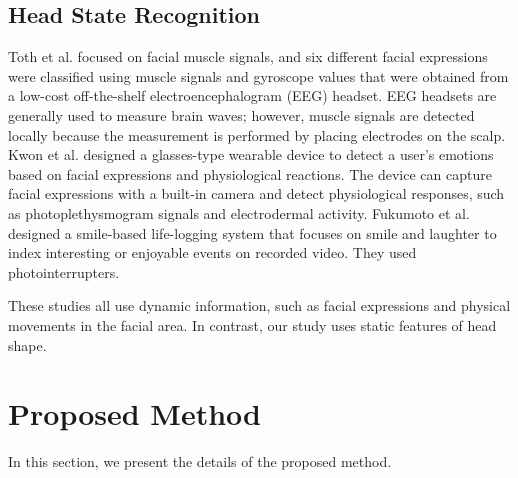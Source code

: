 \documentclass[sigconf,authordraft]{acmart}
\begin{document}
\subsection{Head State Recognition}
Toth et al. \cite{facial_expression_headset} focused on facial muscle signals, and six different facial expressions were classified using muscle signals and gyroscope values that were obtained from a low-cost off-the-shelf electroencephalogram (EEG) headset. EEG headsets are generally used to measure brain waves; however, muscle signals are detected locally because the measurement is performed by placing electrodes on the scalp.
Kwon et al. \cite{facial_expression_glasses} designed a glasses-type wearable device to detect a user's emotions based on facial expressions and physiological reactions. The device can capture facial expressions with a built-in camera and detect physiological responses, such as photoplethysmogram signals and electrodermal activity. Fukumoto et al. \cite{fukumoto} designed a smile-based life-logging system that focuses on smile and laughter to index interesting or enjoyable events on recorded video. They used photointerrupters.\par

These studies all use dynamic information, such as facial expressions and physical movements in the facial area. In contrast, our study uses static features of head shape.


\section{Proposed Method}
\label{sec:method}
In this section, we present the details of the proposed method.
\end{document}
